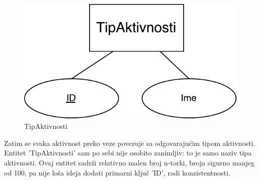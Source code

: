 \documentclass[times, utf8, zavrsni]{fer}
\begin{document}
\begin{figure}[H]
\centering
\includegraphics[keepaspectratio]{img/tip-aktivnosti.pdf}
\caption{TipAktivnosti}
\label{fig:tip-aktivnosti}
\end{figure}

Zatim se svaka aktivnost preko veze povezuje sa odgovarajućim tipom aktivnosti. Entitet 'TipAktivnosti' sam po sebi nije osobito zanimljiv: to je samo naziv tipa aktivnosti. Ovaj entitet sadrži relativno malen broj n-torki, broja sigurno manjeg od 100, pa nije loša ideja dodati primarni ključ 'ID', radi konzistentnosti.\\
\end{document}
